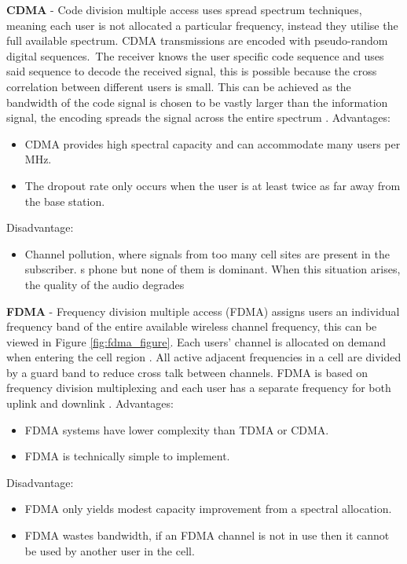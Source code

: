 \documentclass{article}
\begin{document}
\textbf{CDMA} - Code division multiple access uses spread spectrum techniques, meaning each user is not allocated a particular frequency, instead they utilise the full available spectrum. CDMA transmissions are encoded with pseudo-random digital sequences\cite{cdma_info}.\ The receiver knows the user specific code sequence and uses said sequence to decode the received signal, this is possible because the cross correlation between different users is small. This can be achieved as the bandwidth of the code signal is chosen to be vastly larger than the information signal, the encoding spreads the signal across the entire spectrum \cite{cdma_info}. \newline
Advantages:\
\begin{itemize}
    \item CDMA provides high spectral capacity and can accommodate many users per MHz.
    \item The dropout rate only occurs when the user is at least twice as far away from the base station.
\end{itemize}
Disadvantage:\
\begin{itemize}
    \item Channel pollution, where signals from too many cell sites are present in the subscriber. s phone but none of them is dominant. When this situation arises, the quality of the audio degrades
\end{itemize}
\textbf{FDMA} - Frequency division multiple access (FDMA) assigns users an individual frequency band of the entire available wireless channel frequency, this can be viewed in Figure \ref{fig:fdma_figure}. Each users' channel is allocated on demand when entering the cell region \cite[Section...]{fdma_info}. All active adjacent frequencies in a cell are divided by a guard band to reduce cross talk between channels. FDMA is based on frequency division multiplexing and each user has a separate frequency for both uplink and downlink \cite{fdma_info}.  
Advantages:\
\begin{itemize}
    \item FDMA systems have lower complexity than TDMA or CDMA.
    \item FDMA is technically simple to implement. 
\end{itemize}
Disadvantage:\
\begin{itemize}
    \item FDMA only yields modest capacity improvement from a spectral allocation.
    \item FDMA wastes bandwidth, if an FDMA channel is not in use then it cannot be used by another user in the cell. 
\end{itemize}
\end{document}
